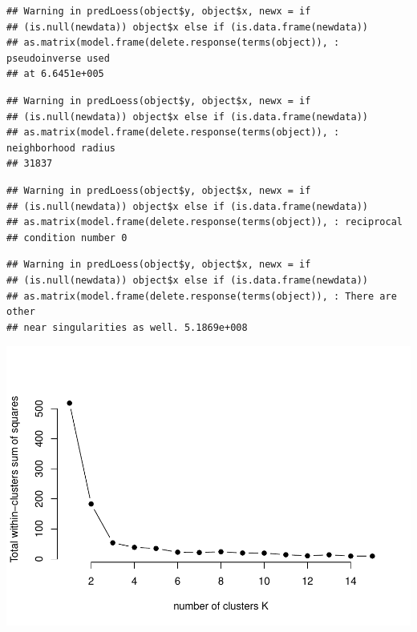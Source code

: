 \documentclass[]{article}
\begin{document}
\begin{verbatim}
## Warning in predLoess(object$y, object$x, newx = if
## (is.null(newdata)) object$x else if (is.data.frame(newdata))
## as.matrix(model.frame(delete.response(terms(object)), : pseudoinverse used
## at 6.6451e+005
\end{verbatim}

\begin{verbatim}
## Warning in predLoess(object$y, object$x, newx = if
## (is.null(newdata)) object$x else if (is.data.frame(newdata))
## as.matrix(model.frame(delete.response(terms(object)), : neighborhood radius
## 31837
\end{verbatim}

\begin{verbatim}
## Warning in predLoess(object$y, object$x, newx = if
## (is.null(newdata)) object$x else if (is.data.frame(newdata))
## as.matrix(model.frame(delete.response(terms(object)), : reciprocal
## condition number 0
\end{verbatim}

\begin{verbatim}
## Warning in predLoess(object$y, object$x, newx = if
## (is.null(newdata)) object$x else if (is.data.frame(newdata))
## as.matrix(model.frame(delete.response(terms(object)), : There are other
## near singularities as well. 5.1869e+008
\end{verbatim}

\includegraphics{01-Build_DS_and_EDA_files/figure-latex/unnamed-chunk-8-1.pdf}
\end{document}
